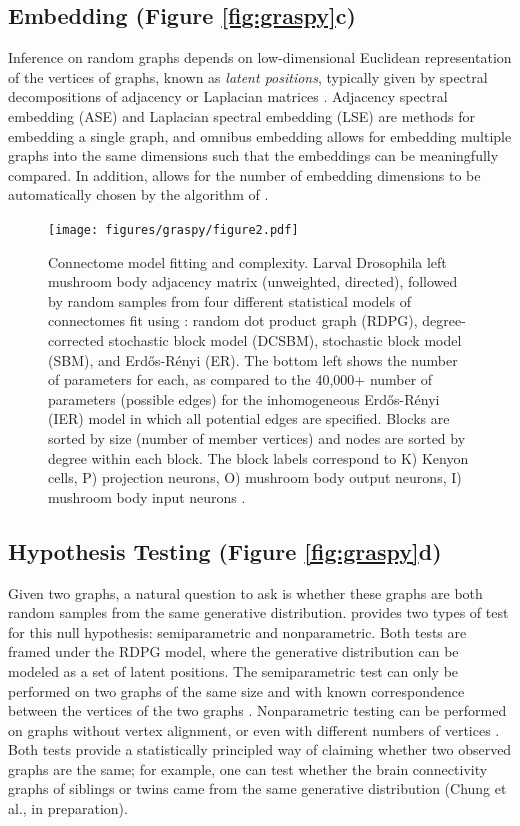 \subsection{Embedding (Figure \ref{fig:graspy}c)}
Inference on random graphs depends on low-dimensional Euclidean representation of the vertices of graphs, known as \textit{latent positions}, typically given by spectral decompositions of adjacency or Laplacian matrices \citep{levin2017central}. Adjacency spectral embedding (ASE) and Laplacian spectral embedding (LSE) are methods for embedding a single graph, and omnibus embedding allows for embedding multiple graphs into the same dimensions such that the embeddings can be meaningfully compared. In addition, \graspy allows for the number of embedding dimensions to be automatically chosen by the algorithm of \cite{zhu2006automatic}. 

\begin{figure}[t!]
    \centering
    \texttt{[image: figures/graspy/figure2.pdf]}
    \caption{Connectome model fitting and complexity.  Larval Drosophila left mushroom body adjacency matrix (unweighted, directed), followed by random samples from four different statistical models of connectomes fit using \graspy: random dot product graph (RDPG), degree-corrected stochastic block model (DCSBM), stochastic block model (SBM), and Erd\H os-R\'enyi (ER). The bottom left shows the number of parameters for each, as compared to the 40,000+ number of parameters (possible edges) for the inhomogeneous Erd\H os-R\'enyi (IER) model in which all potential edges are specified. Blocks are sorted by size (number of member vertices) and nodes are sorted by degree within each block. The block labels correspond to K) Kenyon cells, P) projection neurons, O) mushroom body output neurons, I) mushroom body input neurons \citep{eichler2017complete}.
    }
    \label{fig:my_label}
\end{figure}

\subsection{Hypothesis Testing (Figure \ref{fig:graspy}d)}
Given two graphs, a natural question to ask is whether these graphs are both random samples from the same generative distribution. \graspy provides two types of test for this null hypothesis: semiparametric and nonparametric. Both tests are framed under the RDPG model, where the generative distribution can be modeled as a set of latent positions. The semiparametric test can only be performed on two graphs of the same size and with known correspondence between the vertices of the two graphs \citep{tang2017semiparametric}. Nonparametric testing can be performed on graphs without vertex alignment, or even with different numbers of vertices \citep{tang2014nonparametric}. Both tests provide a statistically principled way of claiming whether two observed graphs are the same; for example, one can test whether the brain connectivity graphs of siblings or twins came from the same generative distribution (Chung et al., in preparation). 

